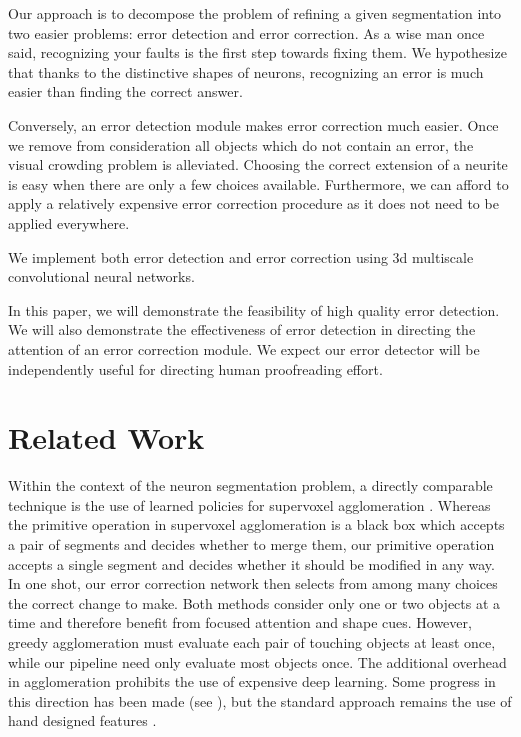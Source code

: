 \documentclass{article}
\begin{document}
Our approach is to decompose the problem of refining a given segmentation into two easier problems: error detection and error correction. As a wise man once said, recognizing your faults is the first step towards fixing them. We hypothesize that thanks to the distinctive shapes of neurons, recognizing an error is much easier than finding the correct answer. 

Conversely, an error detection module makes error correction much easier. Once we remove from consideration all objects which do not contain an error, the visual crowding problem is alleviated. Choosing the correct extension of a neurite is easy when there are only a few choices available. Furthermore, we can afford to apply a relatively expensive error correction procedure as it does not need to be applied everywhere.

We implement both error detection and error correction using 3d multiscale convolutional neural networks.

In this paper, we will demonstrate the feasibility of high quality error detection. We will also demonstrate the effectiveness of error detection in directing the attention of an error correction module. We expect our error detector will be independently useful for directing human proofreading effort.

\section{Related Work}
Within the context of the neuron segmentation problem, a directly comparable technique is the use of learned policies for supervoxel agglomeration \cite{lash,gala}. Whereas the primitive operation in supervoxel agglomeration is a black box which accepts a pair of segments and decides whether to merge them, our primitive operation accepts a single segment and decides whether it should be modified in any way. In one shot, our error correction network then selects from among many choices the correct change to make. Both methods consider only one or two objects at a time and therefore benefit from focused attention and shape cues. However, greedy agglomeration must evaluate each pair of touching objects at least once, while our pipeline need only evaluate most objects once. The additional overhead in agglomeration prohibits the use of expensive deep learning. Some progress in this direction has been made (see \cite{convnet_agglomeration}), but the standard approach remains the use of hand designed features \cite{gala}.
\end{document}
